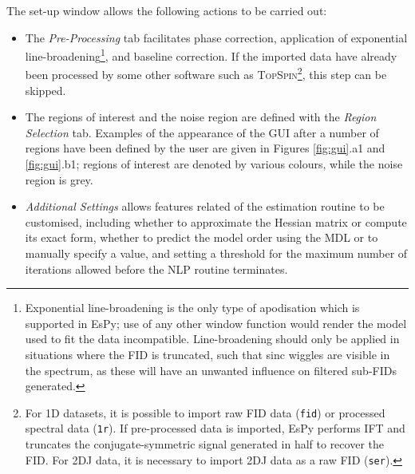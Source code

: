 The set-up window allows the following actions to be carried out:
\begin{itemize}
    \item The \emph{Pre-Processing} tab facilitates phase correction,
        application of exponential line-broadening\footnote{
            Exponential line-broadening is the only type of apodisation which
            is supported in \ac{EsPy}; use of any other window function
            would render the model used to fit the data incompatible.
            Line-broadening should only be applied in
            situations where the \ac{FID} is truncated, such that sinc wiggles
            are visible in the spectrum, as these will have an unwanted
            influence on filtered sub-\acp{FID} generated.
        }, and baseline correction. If the imported data have already been
        processed by some other software such as \textsc{TopSpin}\footnote{
            For \ac{1D} datasets, it is possible to import raw \ac{FID} data
            (\texttt{fid}) or processed spectral data (\texttt{1r}). If
            pre-processed data is imported, \ac{EsPy} performs \ac{IFT} and
            truncates the conjugate-symmetric signal generated in half to
            recover the \ac{FID}. For \ac{2DJ} data, it is necessary to import
            \ac{2DJ} data as a raw \ac{FID} (\texttt{ser}).
        }, this step can be skipped.
    \item The regions of interest and the noise region are
        defined with the \emph{Region Selection} tab. Examples of the
        appearance of the \ac{GUI} after a number of regions have been defined
        by the user are given in Figures \ref{fig:gui}.a1 and \ref{fig:gui}.b1;
        regions of interest are denoted by various colours, while the noise region
        is grey.
    \item \emph{Additional Settings} allows features related of the estimation
        routine to be customised, including whether to approximate the Hessian
        matrix or compute its exact form, whether to predict the model order
        using the \ac{MDL} or to manually specify a value, and setting a
        threshold for the maximum number of iterations allowed before the
        \ac{NLP} routine terminates.
\end{itemize}

